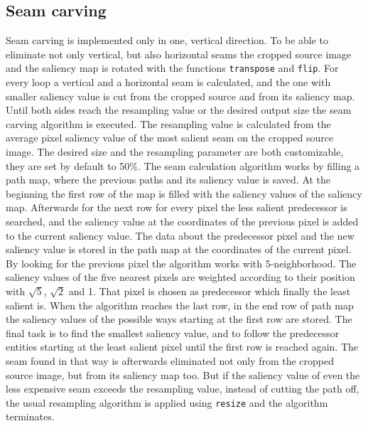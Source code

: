 \documentclass[draft,final]{vutinfth} %
\begin{document}
\subsection{Seam carving}
Seam carving is implemented only in one, vertical direction. 
To be able to eliminate not only vertical, but also horizontal seams the cropped source image and the saliency map is rotated with the functions \texttt{transpose} and \texttt{flip}.
For every loop a vertical and a horizontal seam is calculated, and the one with smaller saliency value is cut from the cropped source and from its saliency map.
Until both sides reach the resampling value or the desired output size the seam carving algorithm is executed.
The resampling value is calculated from the average pixel saliency value of the most salient seam on the cropped source image.
The desired size and the resampling parameter are both customizable, they are set by default to 50\%. 
The seam calculation algorithm works by filling a path map, where the previous paths and its saliency value is saved.
At the beginning the first row of the map is filled with the saliency values of the saliency map.
Afterwards for the next row for every pixel the less salient predecessor is searched, and the saliency value at the coordinates of the previous pixel is added to the current saliency value.
The data about the predecessor pixel and the new saliency value is stored in the path map at the coordinates of the current pixel.
By looking for the previous pixel the algorithm works with 5-neighborhood. 
The saliency values of the five nearest pixels are weighted according to their position with $\sqrt{5}$, $\sqrt{2}$ and 1.
That pixel is chosen as predecessor which finally the least salient is.
When the algorithm reaches the last row, in the end row of path map the saliency values of the possible ways starting at the first row are stored.
The final task is to find the smallest saliency value, and to follow the predecessor entities starting at the least salient pixel until the first row is reached again.
The seam found in that way is afterwards eliminated not only from the cropped source image, but from its saliency map too.
But if the saliency value of even the less expensive seam exceeds the resampling value, instead of cutting the path off, the usual resampling algorithm is applied using \texttt{resize} and the algorithm terminates.  



\backmatter

\listoffigures %

\cleardoublepage %
\listoftables %

\listofalgorithms
{}

\printindex

\printglossaries



\end{document}
